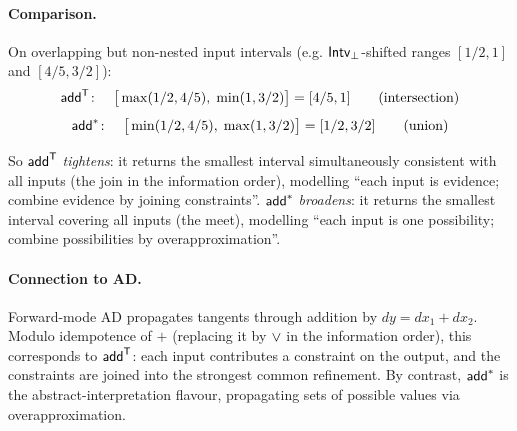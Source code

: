\paragraph{Comparison.} On overlapping but non-nested input intervals (e.g. $\mathsf{Intv}_{\bot}$-shifted ranges $[1/2, 1]$
and $[4/5, 3/2]$):
\[
  \mathsf{add}^{\mathsf{T}}\colon\quad \big[\max(1/2, 4/5),\; \min(1, 3/2)\big] = [4/5, 1] \qquad \text{(intersection)}
\]
\[
  \mathsf{add}^*\colon\quad \big[\min(1/2, 4/5),\; \max(1, 3/2)\big] = [1/2, 3/2] \qquad \text{(union)}
\]

\noindent So $\mathsf{add}^{\mathsf{T}}$ \emph{tightens}: it returns the smallest interval simultaneously consistent with all
inputs (the join in the information order), modelling ``each input is evidence; combine evidence by joining
constraints''. $\mathsf{add}^*$ \emph{broadens}: it returns the smallest interval covering all inputs (the meet),
modelling ``each input is one possibility; combine possibilities by overapproximation''.

\paragraph{Connection to AD.} Forward-mode AD propagates tangents through addition by $dy = dx_1 + dx_2$.
Modulo idempotence of $+$ (replacing it by $\vee$ in the information order), this corresponds to $\mathsf{add}^{\mathsf{T}}$:
each input contributes a constraint on the output, and the constraints are joined into the strongest
common refinement. By contrast, $\mathsf{add}^*$ is the abstract-interpretation flavour, propagating sets of possible
values via overapproximation.
